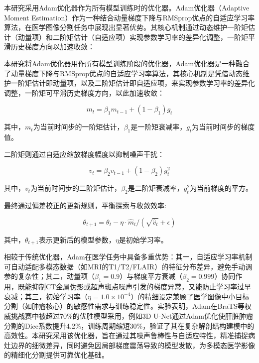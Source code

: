 本研究采用Adam优化器作为所有模型训练时的优化器。Adam优化器（Adaptive Moment Estimation）作为一种结合动量梯度下降与RMSprop优点的自适应学习率算法，在医学图像分割任务中展现出显著优势。其核心机制通过动态维护一阶矩估计（动量项）和二阶矩估计（自适应项）实现参数学习率的差异化调整，一阶矩平滑历史梯度方向以加速收敛：

本研究将Adam优化器用作所有模型训练阶段的优化器，Adam优化器是一种融合了动量梯度下降与RMSprop优点的自适应学习率算法，其核心机制是凭借动态维护一阶矩估计即动量项，以及二阶矩估计即自适应项，来实现参数学习率的差异化调整，一阶矩可平滑历史梯度方向，以此加速收敛：

\begin{equation}
    m_t = \beta_1 m_{t-1} + (1 - \beta_1) g_t
\end{equation}

其中，$m_t$为当前时间步的一阶矩估计，$\beta_1$是一阶矩衰减率，$g_t$为当前时间步的梯度值。

二阶矩则通过自适应缩放梯度幅度以抑制噪声干扰：

\begin{equation}
    v_t = \beta_2 v_{t-1} + (1 - \beta_2) g_t^2
\end{equation}

其中，$v_t$为当前时间步的二阶矩估计，$\beta_2$是二阶矩衰减率，$g_t^2$为当前梯度的平方。

最终通过偏差校正的更新规则，平衡探索与收敛效率:

\begin{equation}
    \theta_{t+1} = \theta_t - \eta \cdot \hat{m}_t / (\sqrt{\hat{v}_t} + \epsilon)
\end{equation}

其中，$\theta_{t+1}$表示更新后的模型参数，$\eta$是初始学习率。

相较于传统优化器，Adam在医学任务中具备多重优势：其一，自适应学习率机制可自动适配多模态数据（如MRI的T1/T2/FLAIR）的特征分布差异，避免手动调参的复杂性；其二，动量项（\( \beta_1=0.9 \)）与梯度平方衰减（\( \beta_2=0.999 \)）协同作用，既能抑制CT金属伪影或超声斑点噪声引发的梯度异常，又能防止学习率过早衰减；其三，初始学习率（\( \eta=1.0 \times 10^{-4} \)）的精细设定兼顾了医学图像中小目标分割（如肿瘤核心）的敏感性需求与训练稳定性。实验表明，Adam在BraTS等权威挑战赛中被超过70\%的优胜模型采用，例如3D U-Net通过Adam优化使肝脏肿瘤分割的Dice系数提升4.2\%，训练周期缩短30\%，验证了其在复杂解剖结构建模中的高效性。本研究采用该优化器，旨在通过其噪声鲁棒性与自适应特性，精准捕捉病灶边界的细微差异，同时避免因局部梯度震荡导致的模型发散，为多模态医学影像的精细化分割提供可靠优化基础。

